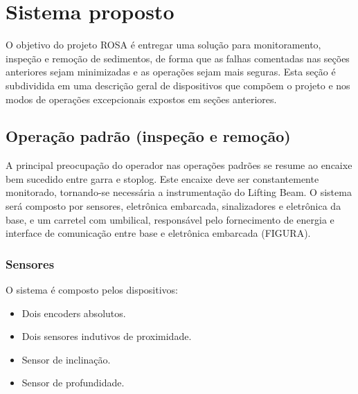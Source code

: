 

\chapter{Sistema proposto}
O objetivo do projeto ROSA é entregar uma solução para monitoramento, inspeção e
remoção de sedimentos, de forma que as falhas comentadas nas seções anteriores
sejam minimizadas e as operações sejam mais seguras. Esta seção é subdividida em
uma descrição geral de dispositivos que compõem o projeto e nos modos de
operações excepcionais expostos em seções anteriores.



\section{Operação padrão (inspeção e remoção)}
A principal preocupação do operador nas operações padrões se resume ao encaixe
bem sucedido entre garra e stoplog. Este encaixe deve ser constantemente
monitorado, tornando-se necessária a instrumentação do Lifting Beam. O sistema
será composto por sensores, eletrônica embarcada, sinalizadores e eletrônica da
base, e um carretel com umbilical, responsável pelo fornecimento de energia e
interface de comunicação entre base e eletrônica embarcada (FIGURA).

\subsection{Sensores}
O sistema é composto pelos dispositivos:
\begin{itemize}
\item Dois encoders absolutos.
\item Dois sensores indutivos de proximidade.
\item Sensor de inclinação.
\item Sensor de profundidade.
\end{itemize}

